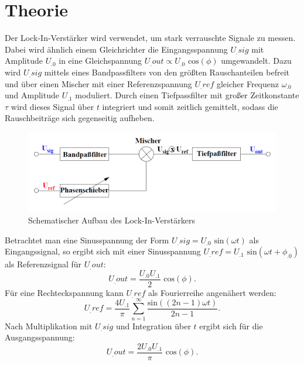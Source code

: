 
\section{Theorie}
\label{sec:Theorie}

Der Lock-In-Verstärker wird verwendet, um stark verrauschte Signale zu messen. Dabei wird ähnlich einem Gleichrichter die Eingangsspannung $U_.{sig}$ mit Amplitude $U_.0$ in eine Gleichspannung $U_.{out}\propto U_.0 \text{ cos}(\phi)$ umgewandelt. Dazu wird $U_.{sig}$ mittels eines Bandpassfilters von den größten Rauschanteilen befreit und über einen Mischer mit einer Referenzspannung $U_.{ref}$ gleicher Frequenz $\omega_.0$ und Amplitude $U_.1$ moduliert.
Durch einen Tiefpassfilter mit großer Zeitkonstante $\tau$ wird dieses Signal über $t$ integriert und somit zeitlich gemittelt, sodass die Rauschbeiträge sich gegenseitig aufheben.
\begin{figure}
	\centering
	\includegraphics[width=\linewidth-60pt,height=\textheight-60pt,keepaspectratio]{content/images/schematischerAufbau.png}
	\caption{Schematischer Aufbau des Lock-In-Verstärkers\cite{V303}}
	\label{fig:schematischerAufbau}
\end{figure}

\noindent Betrachtet man eine Sinusspannung der Form $U_.{sig}=U_.0 \text{ sin}(\omega t)$ als Eingangssignal, so ergibt sich mit einer Sinusspannung $U_.{ref}=U_.1 \text{ sin}(\omega t+\phi_.0)$ als Referenzsignal für $U_.{out}$:
\begin{equation}
U_.{out} = \frac{U_.0U_.1}{2} \text{ cos}(\phi)\text{.} \label{eq:Uout}
\end{equation}
Für eine Rechteckspannung kann $U_.{ref}$ als Fourierreihe angenähert werden:
\begin{equation}
U_.{ref} = \frac{4U_.1}{\pi}\sum_{n=1}^{\infty}\frac{\text{sin}((2n-1)\omega t)}{2n-1}\text{.}
\end{equation}
Nach Multiplikation mit $U_.{sig}$ und Integration über $t$ ergibt sich für die Ausgangsspannung:
\begin{equation}
U_.{out} = \frac{2U_.0U_.1}{\pi} \text{ cos}(\phi)\text{.}
\end{equation}